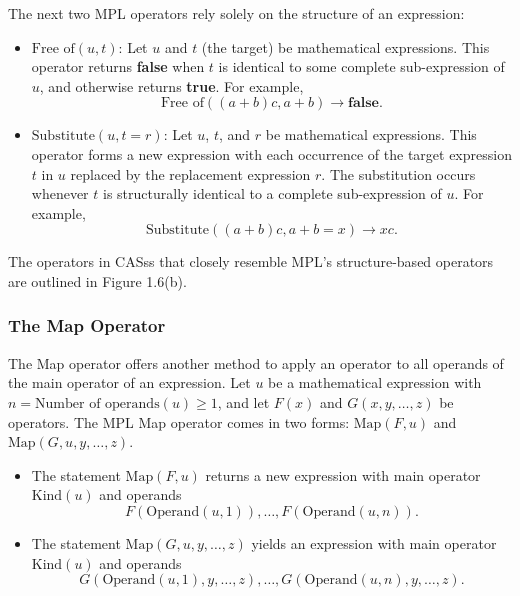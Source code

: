 The next two \ac{MPL} operators rely solely on the structure of an expression:
%
\begin{itemize}
  \setlength{\itemsep}{0.0em}
  \item $\text{Free of}(u, t)$: Let $u$ and $t$ (the target) be mathematical expressions. This operator returns \textbf{false} when $t$ is identical to some complete sub-expression of $u$, and otherwise returns \textbf{true}. For example,
  \begin{equation*}
    \text{Free of}((a+b)c, a+b) \rightarrow \textbf{false}.
  \end{equation*}
  \item $\text{Substitute}(u, t = r)$: Let $u$, $t$, and $r$ be mathematical expressions. This operator forms a new expression with each occurrence of the target expression $t$ in $u$ replaced by the replacement expression $r$. The substitution occurs whenever $t$ is structurally identical to a complete sub-expression of $u$. For example,
  \begin{equation*}
    \text{Substitute}((a+b)c, a+b=x) \rightarrow xc.
  \end{equation*}
\end{itemize}
%
The operators in \acp{CAS}s that closely resemble \ac{MPL}'s structure-based operators are outlined in Figure 1.6(b).

\subsubsection{The Map Operator}

The Map operator offers another method to apply an operator to all operands of the main operator of an expression. Let $u$ be a mathematical expression with $n = \text{Number of operands}(u) \geq 1$, and let $F(x)$ and $G(x,y,\dots,z)$ be operators. The \ac{MPL} Map operator comes in two forms: $\text{Map}(F,u)$ and $\text{Map}(G,u,y,\dots,z)$.
%
\begin{itemize}
  \setlength{\itemsep}{0.0em}
  \item The statement $\text{Map}(F, u)$ returns a new expression with main operator $\text{Kind}(u)$ and operands
  \begin{equation*}
    F(\text{Operand}(u, 1)), \ldots, F (\text{Operand}(u, n)).
  \end{equation*}
  \item The statement $\text{Map}(G,u,y,\dots,z)$ yields an expression with main operator $\text{Kind}(u)$ and operands
  \begin{equation*}
    G(\text{Operand}(u,1),y,\dots,z), \ldots, G(\text{Operand}(u,n),y,\dots,z).
  \end{equation*}
\end{itemize}

